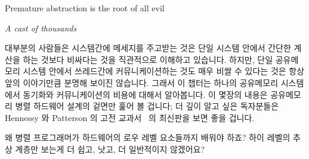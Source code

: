 

\epigraph{Premature abstraction is the root of all evil}
	 {\emph{A cast of thousands}}

대부분의 사람들은 시스템간에 메세지를 주고받는 것은 단일 시스템 안에서 간단한
계산을 하는 것보다 비싸다는 것을 직관적으로 이해하고 있습니다.
하지만, 단일 공유메모리 시스템 안에서 쓰레드간에 커뮤니케이션하는 것도 매우
비쌀 수 있다는 것은 항상 앞의 이야기만큼 분명해 보이진 않습니다.
그래서 이 챕터는 하나의 공유메모리 시스템에서 동기화와 커뮤니케이션의 비용에
대해서 알아봅니다.
이 몇장의 내용은 공유메모리 병렬 하드웨어 설계의 겉면만 훑어 볼 겁니다; 더 깊이
알고 싶은 독자분들은 Hennessy 와 Patterson 의 고전 교과서~\cite{Hennessy95a} 의
최신판을 보면 좋을 겁니다.
\iffalse

Most people have an intuitive understanding that passing messages between
systems is considerably more expensive than performing simple calculations
within the confines of a single system.
However, it is not always so clear that communicating among threads within
the confines of a single shared-memory system can also be quite expensive.
This chapter therefore looks at the cost of synchronization and communication
within a shared-memory system.
These few pages can do no more than scratch the surface of shared-memory
parallel hardware design; readers desiring more detail would do well
to start with a recent edition of Hennessy and Patterson's classic
text~\cite{Hennessy95a}.
\fi

\QuickQuiz{}
	왜 병렬 프로그래머가 하드웨어의 로우 레벨 요소들까지 배워야 하죠?
	하이 레벨의 추상 계층만 보는게 더 쉽고, 낫고, 더 일반적이지 않겠어요?

